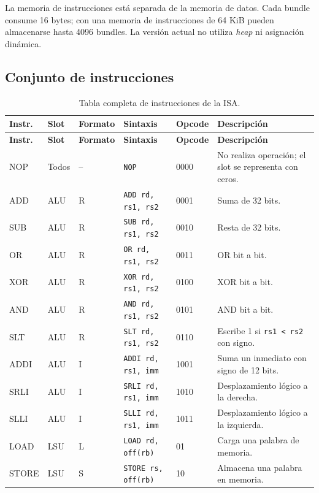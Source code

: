 \documentclass[11pt,letterpaper]{article}
\begin{document}
La memoria de instrucciones está separada de la memoria de datos. Cada bundle consume 16 bytes; con una memoria de instrucciones de 64 KiB pueden almacenarse hasta 4096 bundles. La versión actual no utiliza \textit{heap} ni asignación dinámica.

\subsection{Conjunto de instrucciones}

\begin{landscape}
\begin{longtable}{p{1.7cm}p{1.5cm}p{1.5cm}p{5.4cm}p{1.5cm}p{7.2cm}}
\caption{Tabla completa de instrucciones de la ISA.}\label{tab:isa}\\
\toprule
\textbf{Instr.} & \textbf{Slot} & \textbf{Formato} & \textbf{Sintaxis} & \textbf{Opcode} & \textbf{Descripción} \\
\midrule
\endfirsthead
\toprule
\textbf{Instr.} & \textbf{Slot} & \textbf{Formato} & \textbf{Sintaxis} & \textbf{Opcode} & \textbf{Descripción} \\
\midrule
\endhead
NOP & Todos & -- & \texttt{NOP} & 0000 & No realiza operación; el slot se representa con ceros. \\
ADD & ALU & R & \texttt{ADD rd, rs1, rs2} & 0001 & Suma de 32 bits. \\
SUB & ALU & R & \texttt{SUB rd, rs1, rs2} & 0010 & Resta de 32 bits. \\
OR & ALU & R & \texttt{OR rd, rs1, rs2} & 0011 & OR bit a bit. \\
XOR & ALU & R & \texttt{XOR rd, rs1, rs2} & 0100 & XOR bit a bit. \\
AND & ALU & R & \texttt{AND rd, rs1, rs2} & 0101 & AND bit a bit. \\
SLT & ALU & R & \texttt{SLT rd, rs1, rs2} & 0110 & Escribe 1 si \texttt{rs1 < rs2} con signo. \\
ADDI & ALU & I & \texttt{ADDI rd, rs1, imm} & 1001 & Suma un inmediato con signo de 12 bits. \\
SRLI & ALU & I & \texttt{SRLI rd, rs1, imm} & 1010 & Desplazamiento lógico a la derecha. \\
SLLI & ALU & I & \texttt{SLLI rd, rs1, imm} & 1011 & Desplazamiento lógico a la izquierda. \\
LOAD & LSU & L & \texttt{LOAD rd, off(rb)} & 01 & Carga una palabra de memoria. \\
STORE & LSU & S & \texttt{STORE rs, off(rb)} & 10 & Almacena una palabra en memoria. \\

\end{longtable}
\end{landscape}
\end{document}
